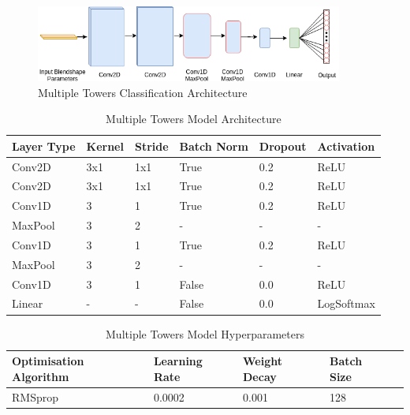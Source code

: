 \begin{figure}[h!]
    \centering
        \includegraphics[width=0.9\textwidth]{figures/classification/blendshape_multi_tower_arch.png}
    \caption{Multiple Towers Classification Architecture}
\end{figure}\label{fig:Blendshape_Multiple_Towers}
\quad

\begin{table}[h!]
\centering
    \begin{tabular}{ | l | l | l | l | l | l |}
    \hline
    Layer Type & Kernel & Stride & Batch Norm & Dropout & Activation \\ \hline
    Conv2D & 3x1 & 1x1 & True & 0.2 & ReLU \\ \hline
    Conv2D & 3x1 & 1x1 & True & 0.2 & ReLU \\ \hline
    Conv1D & 3 & 1 & True & 0.2 & ReLU \\ \hline
    MaxPool & 3 & 2 & - & - & - \\ \hline
    Conv1D & 3 & 1 & True & 0.2 & ReLU \\ \hline
    MaxPool & 3 & 2 & - & - & - \\ \hline
    Conv1D & 3 & 1 & False & 0.0 & ReLU \\ \hline
    Linear & - & - & False & 0.0 & LogSoftmax \\
    \hline
    \end{tabular} 
    \caption{Multiple Towers Model Architecture}
\end{table}\label{table:multi_towers_classifier}
\quad

\begin{table}[h!]
\centering
    \begin{tabular}{ | l | l | l | l | l |}
    \hline
    Optimisation Algorithm & Learning Rate & Weight Decay & Batch Size \\ \hline
    RMSprop & 0.0002 & 0.001 & 128 \\
    \hline
    \end{tabular} 
    \caption{Multiple Towers Model Hyperparameters}
\end{table}\label{table:multi_towers_classifier_hyperparameters}

